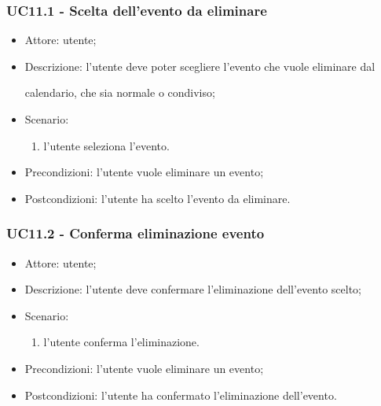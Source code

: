 \subsubsection{UC11.1 - Scelta dell'evento da eliminare} \label{sec: UC11.1}
\begin{itemize}
    \item Attore: utente;
    \item Descrizione: l'utente deve poter scegliere l'evento che vuole eliminare dal \par calendario, che sia normale o condiviso;
    \item Scenario:
        \begin{enumerate}
        \item l'utente seleziona l'evento.
        \end{enumerate}
    
    \item Precondizioni: l'utente vuole eliminare un evento;
    \item Postcondizioni: l'utente ha scelto l'evento da eliminare.
\end{itemize}


\subsubsection{UC11.2 - Conferma eliminazione evento} \label{sec: UC11.2}
\begin{itemize}
    \item Attore: utente;
    \item Descrizione: l'utente deve confermare l'eliminazione dell'evento scelto;
    \item Scenario:
        \begin{enumerate}
        \item l'utente conferma l'eliminazione.
        \end{enumerate}
    
    \item Precondizioni: l'utente vuole eliminare un evento;
    \item Postcondizioni: l'utente ha confermato l'eliminazione dell'evento.
\end{itemize}


